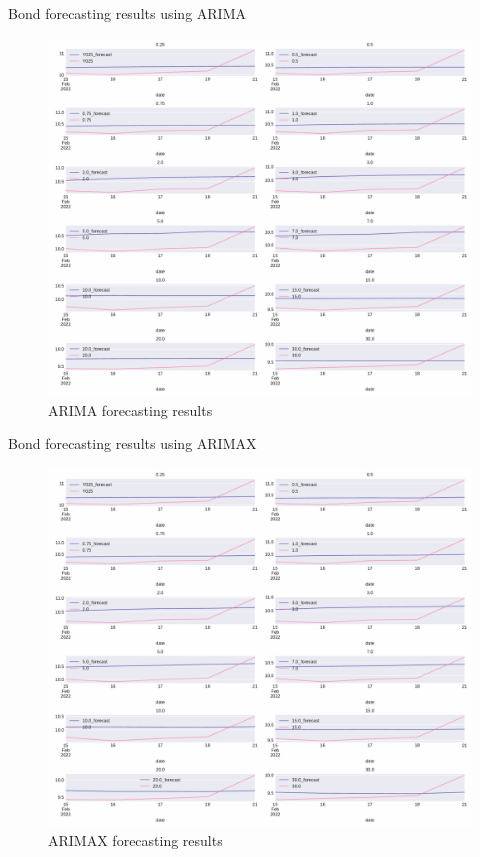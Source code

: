 \documentclass[aspectratio=169]{beamer}
\begin{document}
    \begin{frame}{Bond forecasting results using ARIMA}
        \begin{figure}
            \includegraphics[scale=0.22]{fig/ARIMAfcst copy.pdf}
            \caption{ARIMA forecasting results}
            \label{fig:VARnsfcst}
        \end{figure}
    \end{frame}

    \begin{frame}{Bond forecasting results using ARIMAX}
        \begin{figure}
            \includegraphics[scale=0.22]{fig/ARIMAX_MSFRCST.pdf}
            \caption{ARIMAX forecasting results}
            \label{fig:VARnsfcst}
        \end{figure}
    \end{frame}
\end{document}
